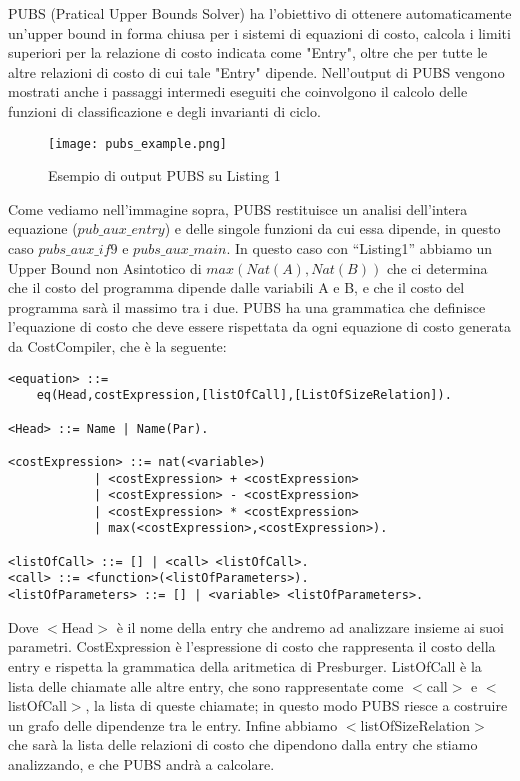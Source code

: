 \documentclass[../../main.tex]{subfiles}
\begin{document}
PUBS (Pratical Upper Bounds Solver) ha l'obiettivo di ottenere automaticamente un'upper bound in forma chiusa per i sistemi di equazioni di costo, calcola i limiti superiori per la relazione di costo indicata come "Entry", oltre che per tutte le altre relazioni di costo di cui tale "Entry" dipende.
Nell'output di PUBS vengono mostrati anche i passaggi intermedi eseguiti che coinvolgono il calcolo delle funzioni di classificazione e degli invarianti di ciclo.

\begin{figure}[H]
    \centering
    \texttt{[image: pubs\_example.png]}
    \caption{Esempio di output PUBS su Listing 1}
\end{figure}
Come vediamo nell'immagine sopra, PUBS restituisce un analisi dell'intera equazione ($pub\_aux\_entry$) e delle singole funzioni da cui essa dipende, in questo caso $pubs\_aux\_if9$ e $pubs\_aux\_main$.
In questo caso con ``Listing1'' abbiamo un Upper Bound non Asintotico di $max(Nat(A), Nat(B))$ che ci determina che il costo del programma dipende dalle variabili A e B, e che il costo del programma sarà il massimo tra i due.
PUBS ha una grammatica che definisce l'equazione di costo che deve essere rispettata da ogni equazione di costo generata da CostCompiler, che è la seguente:
\newpage
\begin{lstlisting}[language=ANTLR, caption={Grammatica PUBS}]
<equation> ::= 
    eq(Head,costExpression,[listOfCall],[ListOfSizeRelation]).

<Head> ::= Name | Name(Par).

<costExpression> ::= nat(<variable>) 
            | <costExpression> + <costExpression> 
            | <costExpression> - <costExpression> 
            | <costExpression> * <costExpression> 
            | max(<costExpression>,<costExpression>).
                
<listOfCall> ::= [] | <call> <listOfCall>.
<call> ::= <function>(<listOfParameters>).
<listOfParameters> ::= [] | <variable> <listOfParameters>.
\end{lstlisting}
Dove $<$Head$>$ è il nome della entry che andremo ad analizzare insieme ai suoi parametri.
CostExpression è l'espressione di costo che rappresenta il costo della entry e rispetta la grammatica della aritmetica di Presburger.
ListOfCall è la lista delle chiamate alle altre entry, che sono rappresentate come $<$call$>$ e $<$listOfCall$>$, la lista di queste chiamate; in questo modo PUBS riesce a costruire un grafo delle dipendenze tra le entry.
Infine abbiamo $<$listOfSizeRelation$>$ che sarà la lista delle relazioni di costo che dipendono dalla entry che stiamo analizzando, e che PUBS andrà a calcolare.
\end{document}
